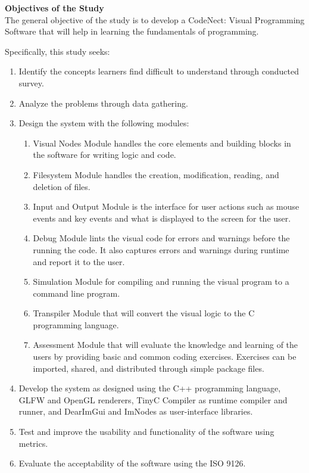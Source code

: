 \flushleft
\textbf{Objectives of the Study}\\
\justifying
\parx
The general objective of the study is to develop a CodeNect: Visual Programming
Software that will help in learning the fundamentals of programming.

\parx
Specifically, this study seeks:

\begin{enumerate}
	\item Identify the concepts learners find difficult to understand through conducted survey.
	\item Analyze the problems through data gathering.
	\item Design the system with the following modules:
		\begin{enumerate}
			\item Visual Nodes Module handles the core elements and building blocks
				in the software for writing logic and code.
			\item Filesystem Module handles the creation, modification, reading, and
				deletion of files.
			\item Input and Output Module is the interface for user actions such as mouse
				events and key events and what is displayed to the screen for the user.
			\item Debug Module lints the visual code for errors and warnings before
				the running the code. It also captures errors and warnings during runtime
				and report it to the user.
			\item Simulation Module for compiling and running the visual program to
				a command line program.
			\item Transpiler Module that will convert the visual logic to the
				C programming language.
			\item Assessment Module that will evaluate the knowledge and learning of the
				users by providing basic and common coding exercises. Exercises can be
				imported, shared, and distributed through simple package files.
		\end{enumerate}

	\item Develop the system as designed using the C++ programming language,
		GLFW and OpenGL renderers, TinyC Compiler as runtime compiler and runner,
		and DearImGui and ImNodes as user-interface libraries.
	\item Test and improve the usability and functionality of the software using metrics.
	\item Evaluate the acceptability of the software using the ISO 9126. \\
\end{enumerate}
